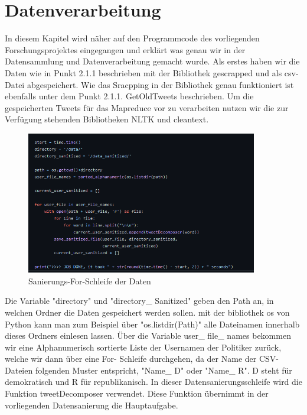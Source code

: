 \section{Datenverarbeitung}
	
	In diesem Kapitel wird näher auf den Programmcode des vorliegenden Forschungsprojektes eingegangen und erklärt was genau wir in der Datensammlung und 
	Datenverarbeitung gemacht wurde. 
	Als erstes haben wir die Daten wie in Punkt 2.1.1 beschrieben mit der Bibliothek gescrapped und als csv-Datei abgespeichert. Wie das Sracpping in der 
	Bibliothek genau funktioniert ist ebenfalls unter dem Punkt 2.1.1. GetOldTweets beschrieben. Um die gespeicherten Tweets für das Mapreduce vor zu 
	verarbeiten nutzen wir die zur Verfügung stehenden Bibliotheken NLTK und cleantext.
	
	
	\begin{figure}[ht]
		\centering
		\includegraphics[width=0.9\textwidth]{images/Kapitel2/Code_Datensanierung_1}
		\caption{\label{fig:DataSan}Sanierungs-For-Schleife der Daten}
	\end{figure}
	
	Die Variable "directory" und "directory\_ Sanitized" geben den Path an, in welchen Ordner die Daten gespeichert werden sollen. mit der bibliothek os von Python 
	kann man zum Beispiel über "os.listdir(Path)" alle Dateinamen innerhalb dieses Ordners einlesen lassen. 
	Über die Variable user\_ file\_ names bekommen wir eine Alphanumerisch sortierte Liste der Usernamen der Politiker zurück, welche wir dann über eine For-
	Schleife durchgehen, da der Name der CSV-Dateien folgenden Muster entspricht, "Name\_ D" oder "Name\_ R". D steht für demokratisch und R für 
	republikanisch. In dieser Datensanierungsschleife wird die Funktion tweetDecomposer verwendet. Diese Funktion übernimmt in der vorliegenden Datensanierung die 
	Hauptaufgabe.\\
	

